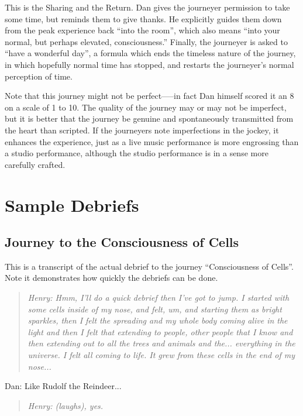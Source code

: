 \documentclass[12pt]{book}
\begin{document}
This is the Sharing and the Return. Dan gives the journeyer permission to take some time, but reminds them to give thanks. He explicitly guides them down from the peak experience back ``into the room'', which also means ``into your normal, but perhaps elevated, consciousness.''
Finally, the journeyer is asked to ``have a wonderful day'', a formula which ends the timeless nature of the journey, in which hopefully normal time has stopped, and restarts the journeyer's normal perception of time.


\hrulefill

Note that this journey might not be perfect—--in fact Dan himself scored it an 8 on a scale of 1 to 10.
The quality of the journey may or may not be imperfect, but it is better that the journey be genuine and spontaneously transmitted from the heart than scripted. If the journeyers note imperfections in the jockey, it enhances the experience, just as a live music performance is more engrossing than a studio performance, although the studio performance is in a sense more carefully crafted.

\chapter{Sample Debriefs}

\section{Journey to the Consciousness of Cells}

This is a transcript of the actual debrief to the journey “Consciousness of Cells”. Note it demonstrates how quickly the debriefs can be done.


\begin{quote}{\em
Henry: Hmm, I'll do a quick debrief then I've got to jump. I started with some cells inside of my nose, and felt, um, and starting them as bright sparkles, then I felt the spreading and my whole body coming alive in the light and then I felt that extending to people, other people that I know and then extending out to all the trees and animals and the... everything in the universe. I felt all coming to life. It grew from these cells in the end of my nose...
}\end{quote}

Dan: Like Rudolf the Reindeer...

\begin{quote}{\em
Henry: (laughs), yes.
}\end{quote}    
\end{document}
